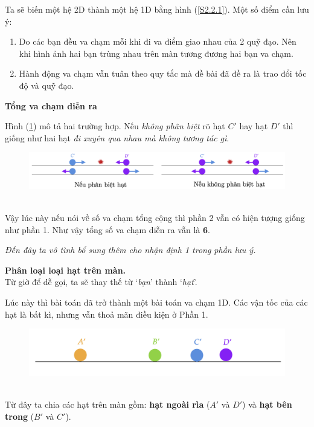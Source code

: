 \begin{enumerate}
Ta sẽ biến một hệ 2D thành một hệ 1D bằng hình (\ref{S2.2.1}). Một số điểm cần lưu ý:
\begin{enumerate}
    \item Do các bạn đều va chạm mỗi khi đi va điểm giao nhau của 2 quỹ đạo. Nên khi hình ảnh hai bạn trùng nhau trên màn tương đương hai bạn va chạm.
    \item Hành động va chạm vẫn tuân theo quy tắc mà đề bài đã đề ra là trao đổi tốc độ và quỹ đạo.
\end{enumerate}
{ \textbf{Tổng va chạm diễn ra}}

Hình (\ref{S2.2.2}) mô tả hai trường hợp. Nếu \textit{không phân biệt} rõ hạt $C'$ hay hạt $D'$ thì giống như hai hạt \textit{đi xuyên qua nhau mà không tương tác gì}. 
\begin{figure}[ht]
    \centering
    \includegraphics[scale=0.45]{Problem_1/Image/S2.2.2.png}
    \caption{}
    \label{S2.2.2}
\end{figure}
\\
Vậy lúc này nếu nói về số va chạm tổng cộng thì phần 2 vẫn có hiện tượng giống như phần 1. Như vậy tổng số va chạm diễn ra vẫn là \textbf{6}.

\textit{Đến đây ta vô tình bổ sung thêm cho nhận định 1 trong phần lưu ý.}

{ \textbf{Phân loại loại hạt trên màn.}}
\\Từ giờ để dễ gọi, ta sẽ thay thế từ `\textit{bạn}' thành `\textit{hạt}'. 

Lúc này thì bài toán đã trở thành một bài toán va chạm 1D. Các vận tốc của các hạt là bất kì, nhưng vẫn thoả mãn điều kiện ở Phần 1.
\begin{figure}[ht]
    \centering
    \includegraphics[scale=0.6]{Problem_1/Image/S2.2.3.png}
    \caption{}
    \label{S2.2.3}
\end{figure}
\\
Từ đây ta chia các hạt trên màn gồm: \textbf{hạt ngoài rìa} ($A'$ và $D'$) và \textbf{hạt bên trong} ($B'$ và $C'$).


\end{enumerate}
